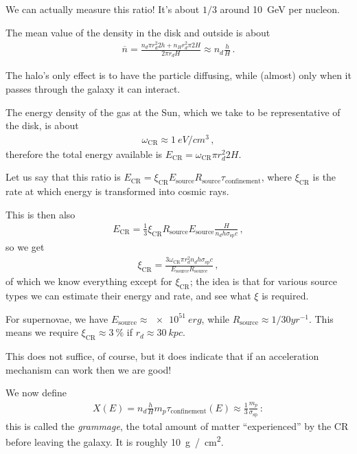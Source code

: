 \documentclass[main.tex]{subfiles}
\begin{document}
We can actually measure this ratio! 
It's about \(1/3\) around \SI{10}{GeV} per nucleon. 


The mean value of the density in the disk and outside is about 
%
\begin{align}
\overline{n} = \frac{n_d \pi r_d^2 2 h + n_H r_d^2 \pi 2H}{2 \pi r_d H} \approx n_d \frac{h}{H}
\,.
\end{align}

The halo's only effect is to have the particle diffusing, 
while (almost) only when it passes through the galaxy it 
can interact. 

The energy density of the gas at the Sun, which we take to be representative of the disk, is about 
%
\begin{align}
\omega _{\text{CR}} \approx \SI{1}{eV / cm^3}
\,,
\end{align}
%
therefore the total energy available is \(E _{\text{CR}} = \omega _{\text{CR}} \pi r_d^2 2 H \). 

Let us say that this ratio is \(E _{\text{CR}} = \xi _{\text{CR}} E _{\text{source}} R _{\text{source}} \tau _{\text{confinement}}\), 
where \(\xi _{\text{CR}}\) is the rate at which energy is transformed into cosmic rays. 

This is then also 
%
\begin{align}
E _{\text{CR}} = \frac{1}{3} \xi _{\text{CR}} R _{\text{source}} E _{\text{source}} \frac{H}{n_d h \sigma _{\text{sp}} c}
\,,
\end{align}
%
so we get 
%
\begin{align}
\xi _{\text{CR}} = \frac{3 \omega _{\text{CR}} \pi r_d^2 n_d h \sigma _{\text{sp}} c}{E _{\text{source}} R _{\text{source}}}
\,,
\end{align}
%
of which we know everything except for \(\xi _{\text{CR}}\); 
the idea is that for various source types we can estimate their energy and rate, and see what \(\xi \) is required. 

For supernovae, we have \(E _{\text{source}} \approx \SI{e51}{erg}\), while \(R _{\text{source}} \approx 1/30\unit{yr^{-1}}\). 
This means we require \(\xi _{\text{CR}} \approx \SI{3}{\percent}\) if \(r_d \approx \SI{30}{kpc}\). 

This does not suffice, of course, but it does indicate that if an acceleration mechanism can work then we are good! 

We now define 
%
\begin{align}
X(E) = n_d \frac{h}{H} m_p \tau _{\text{confinement}}(E) \approx \frac{1}{3} \frac{m_p}{\sigma _{\text{sp}}}
\,:
\end{align}
%
this is called the \emph{grammage}, the total amount of matter ``experienced'' by the CR before leaving the galaxy. 
It is roughly \SI{10}{g / cm^2}. 
\end{document}
